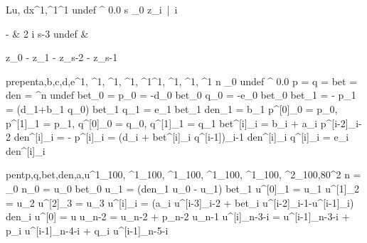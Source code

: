 \documentclass[12pt,a4paper]{book}
\begin{document}
\begin{eqcode}{L}{u, dx}{^1,^1}{^1}
	undef \gets \genar \limits^{} 0.0 \lend
	s \gets {}_0 \lend
	z_i\  |\  i  \gets
	\begin{cases}
		-  
			& 2 \leq i \leq s-3 \lend
		undef 
			& \otherwise \lend
	\end{cases} \lend
	z_0 \gets - 
\lend
	z_1 \gets -  \lend
	z_{s-2} \gets -  \lend
	z_{s-1} \gets {} \lend
\end{eqcode}

\begin{eqcode}{prepent}{a,b,c,d,e}{^1, ^1, ^1, ^1, ^1}{^1, ^1, ^1, ^1}
	n \gets {}_0 \lend
	undef \gets \genar \limits^{} 0.0 \lend
	p = q = bet = den = \genar \limits^{n} undef \lend
	bet_0 =  \lend
	p_0 = -d_0 \cdot bet_0 \lend
	q_0 = -e_0 \cdot bet_0 \lend
	bet_1 = -  \lend
	p_1 = (d_1+b_1 \cdot q_0) \cdot bet_1 \lend
	q_1 = e_1 \cdot bet_1 \lend
	den_1 = b_1 \lend
    p^{[0]}_0 = p_0, p^{[1]}_1 = p_1, q^{[0]}_0 = q_0, q^{[1]}_1 = q_1 \lend
    bet^{[i]}_{i} = b_i + a_i \cdot p^{[i-2]}_{i-2} \lend
	den^{[i]}_i = - \lend
	p^{[i]}_i = (d_i + bet^{[i]}_i \cdot q^{[i-1]})_{i-1} \cdot den^{[i]}_i \lend
	q^{[i]}_i = e_i \cdot den^{[i]}_i \lend
	 \lend
	 \lend
\end{eqcode}

\begin{eqcode}{pent}{p,q,bet,den,a,u}{^1_{100}, ^1_{100}, ^1_{100}, ^1_{100}, ^1_{100}, ^2_{100,80}}{^2}
	n = _0 \lend
	n_0 = u_0 \cdot bet_0 \lend
	u_1 = (den_1 \cdot u_0 - u_1) \cdot bet_1 \lend
    u^{[0]}_1 = u_1 \lend
    u^{[1]}_2 = u_2 \lend
    u^{[2]}_3 = u_3 \lend
	u^{[i]}_i = (a_i \cdot u^{[i-3]}_{i-2} + bet_i \cdot u^{[i-2]}_{i-1}-u^{[i-1]}_i) \cdot den_i \lend
	 \lend
    u^{[0]} = u \lend
	u_{n-2} = u_{n-2} + p_{n-2} \cdot u_{n-1} \lend
	u^{[i]}_{n-3-i} = u^{[i-1]}_{n-3-i} + p_i \cdot u^{[i-1]}_{n-4-i} + q_i \cdot u^{[i-1]}_{n-5-i} \lend
	 \lend
	 \lend
\end{eqcode}
\end{document}
